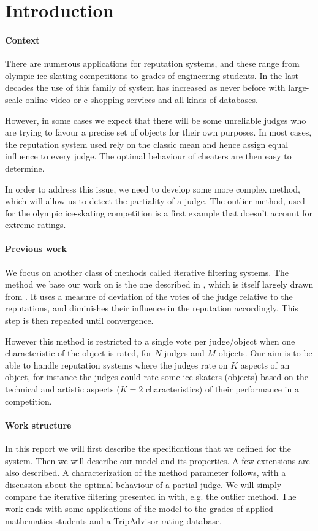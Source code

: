 \documentclass[12pt,a4paper]{article}
\begin{document}


\tableofcontents
\clearpage
\section{Introduction}
\paragraph{Context}
There are numerous applications for reputation systems, and these range from olympic ice-skating competitions to grades of engineering students. 
In the last decades the use of this family of system has increased as never before with large-scale online video or e-shopping services and all kinds of databases.

However, in some cases we expect that there will be some unreliable judges who are trying to favour a precise set of objects for their own purposes. In most cases, the reputation system used rely on the classic mean and hence assign equal influence to every judge. The optimal behaviour of cheaters are then easy to determine. 

In order to address this issue, we need to develop some more complex method, which will allow us to detect the partiality of a judge. The outlier method, used for the olympic ice-skating competition is a first example that doesn't account for extreme ratings.
\paragraph{Previous work}
We focus on another class of methods called iterative filtering systems. The method we base our work on is the one described in \cite{Cristo1}, which is itself largely drawn from \cite{laureti2006information}. It uses a measure of deviation of the votes of the judge relative to the reputations, and diminishes their influence in the reputation accordingly. This step is then repeated until convergence.

However this method is restricted to a single vote per judge/object when one characteristic of the object is rated, for $N$ judges and $M$ objects. Our aim is to be able to handle reputation systems where the judges rate on $K$ aspects of an object, for instance the judges could rate some ice-skaters (objects) based on the technical and artistic aspects ($K=2$ characteristics) of their performance in a competition. 

\paragraph{Work structure}
In this report we will first describe the specifications that we defined for the system. Then we will describe our model and its properties. A few extensions are also described. A characterization of the method parameter follows, with a discussion about the optimal behaviour of a partial judge. We will simply compare the iterative filtering presented in \cite{Cristo1} with, e.g. the outlier method. The work ends with some applications of the model to the grades of applied mathematics students and a TripAdvisor rating database.\\
\end{document}
